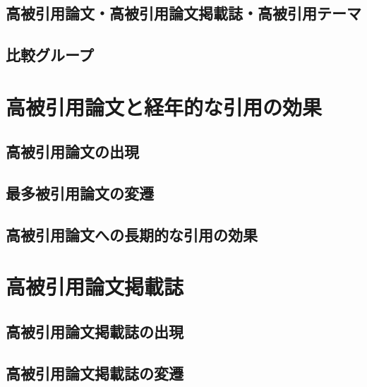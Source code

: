 \documentclass[12pt,a4paper,twocolumn,twoside]{ujsikpb}
\begin{document}
\subsection{高被引用論文・高被引用論文掲載誌・高被引用テーマ}



\subsection{比較グループ}


\section{高被引用論文と経年的な引用の効果}
\subsection{高被引用論文の出現}





\subsection{最多被引用論文の変遷}



\subsection{高被引用論文への長期的な引用の効果}










\section{高被引用論文掲載誌}

\subsection{高被引用論文掲載誌の出現}





\subsection{高被引用論文掲載誌の変遷}






\end{document}
